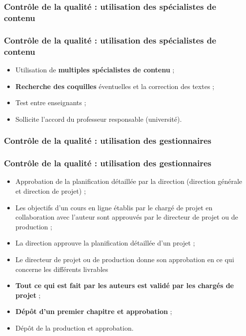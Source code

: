 					\subsubsection{Contrôle de la qualité : utilisation des spécialistes de contenu} 
							\begin{frame}
							\frametitle{Contrôle de la qualité : utilisation des spécialistes de contenu}
                        			
							\begin{itemize}
							
							\item Utilisation de \textbf{multiples spécialistes de contenu} ;
							\item \textbf{Recherche des coquilles} éventuelles et la correction des textes ;
							\item Test entre enseignants ;
							\item Sollicite l’accord du professeur responsable (université).
							\end{itemize}						
					\end{frame}	
					
					\subsubsection{Contrôle de la qualité : utilisation des gestionnaires} 
							\begin{frame}
							\frametitle{Contrôle de la qualité : utilisation des gestionnaires}
                        			
							\begin{itemize}
							\item Approbation de la planification détaillée par la direction (direction générale et direction de projet) ;
							\item Les objectifs d’un cours en ligne établis par le chargé de projet en collaboration avec l’auteur sont approuvés par le directeur de projet ou de production ;
							\item La direction approuve la planification détaillée d’un projet ;
							\item Le directeur de projet ou de production donne son approbation en ce qui concerne les différents livrables
							\item \textbf{Tout ce qui est fait par les auteurs est validé par les chargés de projet} ;
							\item \textbf{Dépôt d’un premier chapitre et approbation} ;
							\item Dépôt de la production et approbation.
							\end{itemize}						
					\end{frame}	
					
